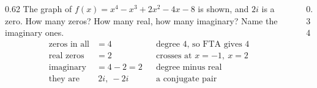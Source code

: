 \documentclass[aspectratio=169, 11pt]{beamer}
\newcommand{\pgrid}[5]{%
  \draw[linegray!45, very thin, xstep=1, ystep=#5] (#1,#3) grid (#2,#4);
  \draw[->, semithick, charcoal] (#1,0)--(#2,0) node[right, font=\tiny, inner sep=1pt]{$x$};
  \draw[->, semithick, charcoal] (0,#3)--(0,#4) node[above, font=\tiny, inner sep=1pt]{$y$};}
\newcommand{\pcurve}[5]{%
  \begin{scope}\clip (#1,#3) rectangle (#2,#4);
    \draw[very thick, forest, domain=#1:#2, samples=160, smooth] plot (\x,{#5});
  \end{scope}}
\newcommand{\xtick}[1]{\foreach \t in {#1}{%
  \draw[charcoal] (\t,0) +(0,-2pt) -- +(0,2pt);
  \node[below, font=\tiny, inner sep=1.5pt, fill=white, fill opacity=0.8, text opacity=1]
    at (\t,0) {$\t$};}}
\begin{document}
\begin{frame}[t, plain]
  \begin{columns}[T]
    \begin{column}{0.62\textwidth}
      The graph of $f(x)=x^4-x^3+2x^2-4x-8$ is shown, and $2i$ is a zero. How many zeros?
      How many real, how many imaginary? Name the imaginary ones.
      \[
      \begin{aligned}
        \text{zeros in all} &= 4 && \text{degree } 4\text{, so FTA gives } 4 \\
        \text{real zeros} &= 2 && \text{crosses at } x=-1,\ x=2 \\
        \text{imaginary} &= 4-2=2 && \text{degree minus real} \\
        \text{they are} &\ 2i,\ -2i && \text{a conjugate pair}
      \end{aligned}
      \]
    \end{column}
    \begin{column}{0.34\textwidth}
      \centering
    \end{column}
  \end{columns}
\end{frame}
\end{document}
